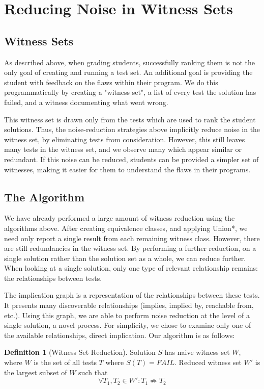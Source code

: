 \documentclass[11pt,twoside]{article}
\newcommand\fail{\mathit{FAIL}}
\theoremstyle{definition}
\newtheorem{defn}{Definition}
\begin{document}
\section{Reducing Noise in Witness Sets}
\subsection{Witness Sets}
As described above, when grading students, successfully ranking them is not the only goal of creating and running a test set. An additional goal is providing the student with feedback on the flaws within their program. We do this programmatically by creating a "witness set", a list of every test the solution has failed, and a witness documenting what went wrong.

This witness set is drawn only from the tests which are used to rank the student solutions. Thus, the noise-reduction strategies above implicitly reduce noise in the witness set, by eliminating tests from consideration. However, this still leaves many tests in the witness set, and we observe many which appear similar or redundant. If this noise can be reduced, students can be provided a simpler set of witnesses, making it easier for them to understand the flaws in their programs.

\subsection{The Algorithm}
We have already performed a large amount of witness reduction using the algorithms above. After creating equivalence classes, and applying Union*, we need only report a single result from each remaining witness class. However, there are still redundancies in the witness set. By performing a further reduction, on a single solution rather than the solution set as a whole, we can reduce further. When looking at a single solution, only one type of relevant relationship remains: the relationships between tests.

The implication graph is a representation of the relationships between these tests. It presents many discoverable relationships (implies, implied by, reachable from, etc.). Using this graph, we are able to perform noise reduction at the level of a single solution, a novel process. For simplicity, we chose to examine only one of the available relationships, direct implication. Our algorithm is as follows:

\begin{defn}[Witness Set Reduction]
Solution $S$ has naive witness set $W$, where $W$ is the set of all tests $T$ where $S(T) = \fail$.
Reduced witness set $W'$ is the largest subset of $W$ such that
$$\forall T_1, T_2 \in W' : T_1 \not\Rightarrow T_2$$
\end{defn}
\end{document}
